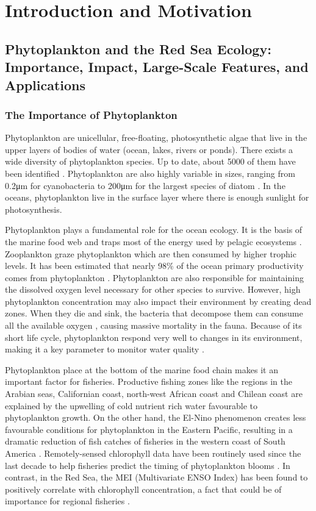 \chapter{Introduction and Motivation}

\section{Phytoplankton and the Red Sea Ecology: Importance, Impact, Large-Scale
Features, and Applications}

\subsection{The Importance of Phytoplankton}

Phytoplankton are unicellular, free-floating, photosynthetic algae that live in 
the upper layers of bodies of water (ocean, lakes, rivers or ponds). There 
exists a wide diversity of phytoplankton species. Up to date, about 5000 of them 
have been identified \citep{Tett1995}. Phytoplankton are also highly variable in 
sizes, ranging from 0.2μm for cyanobacteria to 200μm for the largest species of 
diatom \citep{Pal2014}. In the oceans, phytoplankton live in the surface layer 
where there is enough sunlight for photosynthesis. 

Phytoplankton plays a fundamental role for the ocean ecology. It is the basis of 
the marine food web and traps most of the energy used by pelagic ecosystems 
\citep{Pal2014}. Zooplankton graze phytoplankton which are then consumed by 
higher trophic levels. It has been estimated that nearly 98\% of the ocean 
primary productivity comes from phytoplankton \citep{Pal2014}. Phytoplankton are 
also responsible for maintaining the dissolved oxygen level necessary for other 
species to survive. However, high phytoplankton concentration may also impact 
their environment by creating dead zones. When they die and sink, the bacteria 
that decompose them can consume all the available oxygen \citep{Pal2014}, 
causing massive mortality in the fauna. Because of its short life cycle, 
phytoplankton respond very well to changes in its environment, making it a key 
parameter to monitor water quality \citep{Wu2014}.

Phytoplankton place at the bottom of the marine food chain makes it an important 
factor for fisheries. Productive fishing zones like the regions in the Arabian 
seas, Californian coast, north-west African coast and Chilean coast are 
explained by the upwelling of cold nutrient rich water favourable to 
phytoplankton growth. On the other hand, the El-Nino phenomenon creates less 
favourable conditions for phytoplankton in the Eastern Pacific, resulting in a 
dramatic reduction of fish catches of fisheries in the western coast of South 
America \citep{Robinson2010}. Remotely-sensed chlorophyll data have been 
routinely used since the last decade to help fisheries predict the timing of 
phytoplankton blooms \citep{Robinson2010}. In contrast, in the Red Sea, the MEI 
(Multivariate ENSO Index) has been found to positively correlate with 
chlorophyll concentration, a fact that could be of importance for regional 
fisheries \citep{Raitsos2015}.

